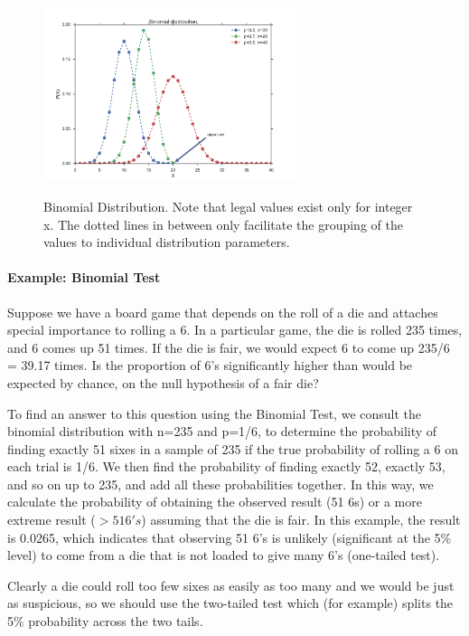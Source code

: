 \begin{figure}
  \centering
  \includegraphics[width=0.66\textwidth]{../Images/Binomial_distribution_pmf.png}\\
  \caption{Binomial Distribution. Note that legal values exist only for integer x. The dotted lines in between only facilitate the grouping of the values to individual distribution parameters.}
\end{figure}


\paragraph{Example: Binomial Test}

Suppose we have a board game that depends on the roll of a die and attaches special importance to rolling a 6. In a particular game, the die is rolled 235 times, and 6 comes up 51 times. If the die is fair, we would expect 6 to come up 235/6 = 39.17 times. Is the proportion of 6's significantly higher than would be expected by chance, on the null hypothesis of a fair die?

To find an answer to this question using the Binomial Test, we consult the binomial distribution with n=235 and p=1/6, to determine the probability of finding exactly 51 sixes in a sample of 235 if the true probability of rolling a 6 on each trial is 1/6. We then find the probability of finding exactly 52, exactly 53, and so on up to 235, and add all these probabilities together. In this way, we calculate the probability of obtaining the observed result (51 6s) or a more extreme result ($>51 6's$) assuming that the die is fair. In this example, the result is 0.0265, which indicates that observing 51 6's is unlikely (significant at the 5\% level) to come from a die that is not loaded to give many 6's (one-tailed test).

Clearly a die could roll too few sixes as easily as too many and we would be just as suspicious, so we should use the two-tailed test which (for example) splits the 5\% probability across the two tails.


